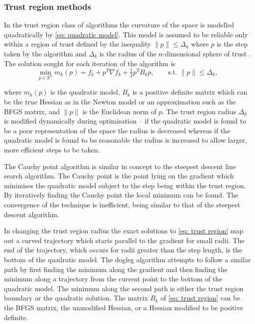 \begin{htmlonly}
\begin{htmlonly}
\subsubsection{Trust region methods}

In the trust region class of algorithms the curvature of the space is modelled quadratically by \eqref{eq: quadratic model}.  This model is assumed to be reliable only within a region of trust defined by the inequality $\lVert p \rVert \leqslant \Delta_k$ where $p$ is the step taken by the algorithm and $\Delta_k$ is the radius of the $n$-dimensional sphere of trust \citep{NocedalWright99}.  The solution sought for each iteration of the algorithm is
\begin{equation} \label{eq: trust region}
 \min_{p \in \mathbb{R}^n} m_k(p) = f_k  +  p^{T} \nabla f_k  +  \tfrac{1}{2} p^{T} B_k p,  \qquad \textrm{s.t. } \lVert p \rVert \leqslant \Delta_k,
\end{equation}

\noindent where $m_k(p)$ is the quadratic model, $B_k$ is a positive definite matrix which can be the true Hessian as in the Newton model or an approximation such as the BFGS matrix, and $\lVert p \rVert$ is the Euclidean norm of $p$.  The trust region radius $\Delta_k$ is modified dynamically during optimisation -- if the quadratic model is found to be a poor representation of the space the radius is decreased whereas if the quadratic model is found to be reasonable the radius is increased to allow larger, more efficient steps to be taken.

The Cauchy point algorithm is similar in concept to the steepest descent line search algorithm.  The Cauchy point is the point lying on the gradient which minimises the quadratic model subject to the step being within the trust region.  By iteratively finding the Cauchy point the local minimum can be found.  The convergence of the technique is inefficient, being similar to that of the steepest descent algorithm.

In changing the trust region radius the exact solutions to \eqref{eq: trust region} map out a curved trajectory which starts parallel to the gradient for small radii.  The end of the trajectory, which occurs for radii greater than the step length, is the bottom of the quadratic model.  The dogleg algorithm attempts to follow a similar path by first finding the minimum along the gradient and then finding the minimum along a trajectory from the current point to the bottom of the quadratic model.  The minimum along the second path is either the trust region boundary or the quadratic solution.  The matrix $B_k$ of \eqref{eq: trust region} can be the BFGS matrix, the unmodified Hessian, or a Hessian modified to be positive definite.


\end{htmlonly}
\end{htmlonly}
